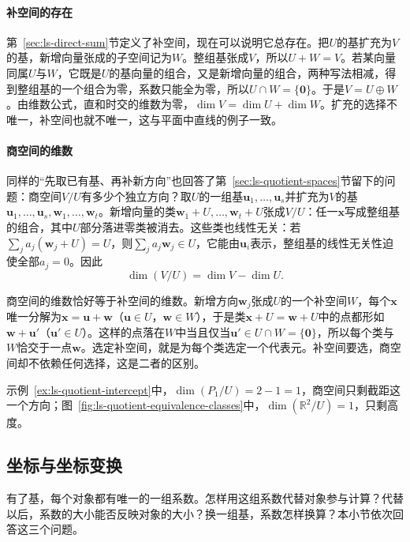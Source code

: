 \paragraph{补空间的存在}
第~\ref{sec:ls-direct-sum}节定义了补空间，现在可以说明它总存在。把$U$的基扩充为$V$的基，新增向量张成的子空间记为$W$。整组基张成$V$，所以$U+W=V$。若某向量同属$U$与$W$，它既是$U$的基向量的组合，又是新增向量的组合，两种写法相减，得到整组基的一个组合为零，系数只能全为零，所以$U\cap W=\{\bm0\}$。于是$V=U\oplus W$。由维数公式，直和时交的维数为零，$\dim V=\dim U+\dim W$。扩充的选择不唯一，补空间也就不唯一，这与平面中直线的例子一致。

\paragraph{商空间的维数}
同样的“先取已有基、再补新方向”也回答了第~\ref{sec:ls-quotient-spaces}节留下的问题：商空间$V/U$有多少个独立方向？取$U$的一组基$\bm u_1,\ldots,\bm u_s$并扩充为$V$的基$\bm u_1,\ldots,\bm u_s,\bm w_1,\ldots,\bm w_t$。新增向量的类$\bm w_1+U,\ldots,\bm w_t+U$张成$V/U$：任一$\bm x$写成整组基的组合，其中$U$部分落进零类被消去。这些类也线性无关：若$\sum_ja_j(\bm w_j+U)=U$，则$\sum_ja_j\bm w_j\in U$，它能由$\bm u_i$表示，整组基的线性无关性迫使全部$a_j=0$。因此
\begin{equation}
 \dim(V/U)=\dim V-\dim U.
 \label{eq:ls-quotient-dimension}
\end{equation}

商空间的维数恰好等于补空间的维数。新增方向$\bm w_j$张成$U$的一个补空间$W$，每个$\bm x$唯一分解为$\bm x=\bm u+\bm w$（$\bm u\in U$，$\bm w\in W$），于是类$\bm x+U=\bm w+U$中的点都形如$\bm w+\bm u'$（$\bm u'\in U$）。这样的点落在$W$中当且仅当$\bm u'\in U\cap W=\{\bm0\}$，所以每个类与$W$恰交于一点$\bm w$。选定补空间，就是为每个类选定一个代表元。补空间要选，商空间却不依赖任何选择，这是二者的区别。

示例~\ref{ex:ls-quotient-intercept}中，$\dim(P_1/U)=2-1=1$，商空间只剩截距这一个方向；图~\ref{fig:ls-quotient-equivalence-classes}中，$\dim(\mathbb R^2/U)=1$，只剩高度。

\subsection{坐标与坐标变换}
\label{sec:ls-coordinates}
\label{sec:linear-algebra-coordinates}

有了基，每个对象都有唯一的一组系数。怎样用这组系数代替对象参与计算？代替以后，系数的大小能否反映对象的大小？换一组基，系数怎样换算？本小节依次回答这三个问题。

